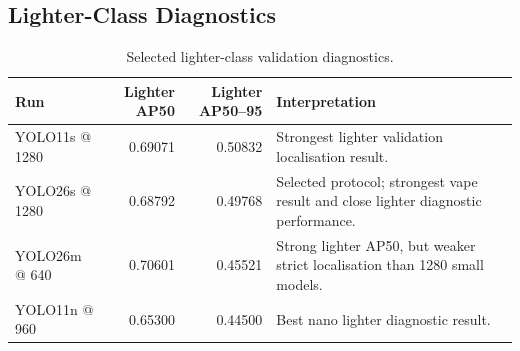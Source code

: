 \begin{table}[H]
\centering
\scriptsize
{}
\caption{Nano lower-bound validation results.}
\label{tab:appendix_uavape_nano}
\end{table}

\subsection{Lighter-Class Diagnostics}

\begin{table}[H]
\centering
\small
\begin{tabularx}{\textwidth}{l r r X}
\toprule
\textbf{Run} & \textbf{Lighter AP50} & \textbf{Lighter AP50--95} & \textbf{Interpretation} \\
\midrule
YOLO11s @ 1280 & 0.69071 & 0.50832 & Strongest lighter validation localisation result. \\
YOLO26s @ 1280 & 0.68792 & 0.49768 & Selected protocol; strongest vape result and close lighter diagnostic performance. \\
YOLO26m @ 640 & 0.70601 & 0.45521 & Strong lighter AP50, but weaker strict localisation than 1280 small models. \\
YOLO11n @ 960 & 0.65300 & 0.44500 & Best nano lighter diagnostic result. \\
\bottomrule
\end{tabularx}
\caption{Selected lighter-class validation diagnostics.}
\label{tab:appendix_uavape_lighter_diagnostic}
\end{table}

